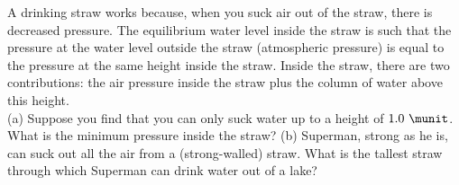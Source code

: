 A drinking straw works because, when you suck air out of the straw, there is
decreased pressure. The equilibrium water level inside the straw is
such that the pressure at the water level outside the straw
(atmospheric pressure) is equal to the pressure at the same height
inside the straw. Inside the straw, there are two contributions: the
air pressure inside the straw plus the column of water above this
height.\\
%
(a) Suppose you find that you can only suck water up to a height of
$1.0\ \munit$. What is the minimum pressure inside the straw?\answercheck\hwendpart
%
(b) Superman, strong as he is, can suck out all the air from a
(strong-walled) straw. What is the tallest straw through which Superman can drink
water out of a lake?\answercheck
